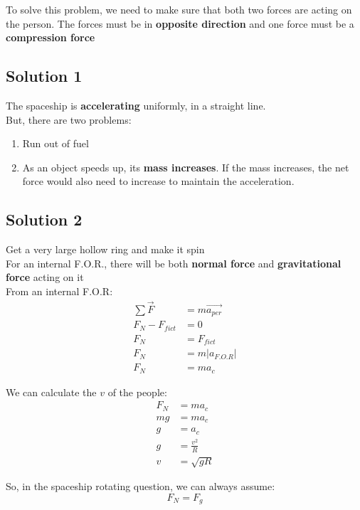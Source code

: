 To solve this problem, we need to make sure that both two forces are acting on the person. The forces must 
be in \textbf{opposite direction} and one force must be a \textbf{compression force}\\

\subsection*{Solution 1}
The spaceship is \textbf{accelerating} uniformly, in a straight line.\\

But, there are two problems:
\begin{enumerate}
    \item Run out of fuel
    \item As an object speeds up, its \textbf{mass increases}. If the mass increases, the net force would also need to increase to maintain the acceleration.
\end{enumerate}

\subsection*{Solution 2}
Get a very large hollow ring and make it spin\\

For an internal F.O.R., there will be both \textbf{normal force} and \textbf{gravitational force} acting on it\\

From an internal F.O.R:
\begin{align*}
    \sum \vec{F} &= m \vec{a_{per}}\\
    F_{N} - F_{fict} &= 0\\
    F_{N} &= F_{fict}\\
    F_{N} &= m\left| a_{F.O.R}\right| \\
    F_{N} &= ma_{c}
\end{align*}

We can calculate the $v$ of the people:
\begin{align*} 
    F_{N} &= ma_{c}\\
    mg &= ma_{c}\\
    g &= a_{c}\\
    g &= \frac{v^2}{R}\\
    v &= \sqrt{gR}
\end{align*}

So, in the spaceship rotating question, we can always assume:
\begin{equation*}
    F_{N} = F_{g}
\end{equation*}

